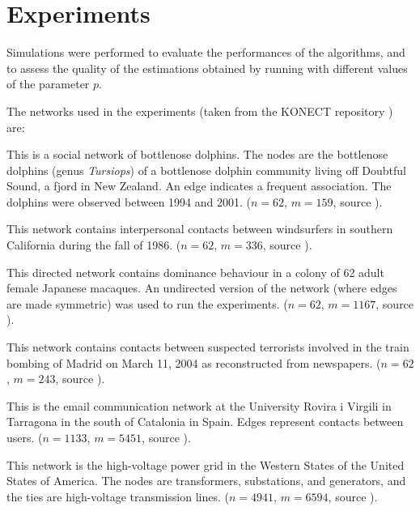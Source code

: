 
\section{Experiments}

Simulations were performed to evaluate the performances of the algorithms, and to assess the quality of the estimations obtained by running \multibfs{} with different values of the parameter $p$.

The networks used in the experiments (taken from the KONECT repository \cite{konect}) are:
\begin{description}[style=standard]
 \item[\texttt{dolphins}] This is a social network of bottlenose dolphins. The nodes are the bottlenose dolphins (genus \emph{Tursiops}) of a bottlenose dolphin community living off Doubtful Sound, a fjord in New Zealand. An edge indicates a frequent association. The dolphins were observed between 1994 and 2001. ($n=62$, $m=159$, source \cite{network:dolphins}).
 \item[\texttt{surf}] This network contains interpersonal contacts between windsurfers in southern California during the fall of 1986. ($n=62$, $m=336$, source \cite{network:surf}).
 \item[\texttt{macaques}] This directed network contains dominance behaviour in a colony of 62 adult female Japanese macaques. An undirected version of the network (where edges are made symmetric) was used to run the experiments. ($n=62$, $m=1167$, source \cite{network:mac}).
 \item[\texttt{train}] This network contains contacts between suspected terrorists involved in the train bombing of Madrid on March 11, 2004 as reconstructed from newspapers. ($n=62$, $m=243$, source \cite{network:train}).
 \item[\texttt{email}] This is the email communication network at the University Rovira i Virgili in Tarragona in the south of Catalonia in Spain. Edges represent contacts between users. ($n=1133$, $m=5451$, source \cite{network:email}).
 \item[\texttt{powergrid}] This network is the high-voltage power grid in the Western States of the United States of America. The nodes are transformers, substations, and generators, and the ties are high-voltage transmission lines. ($n=4941$, $m=6594$, source \cite{network:powergrid}).
\end{description}

